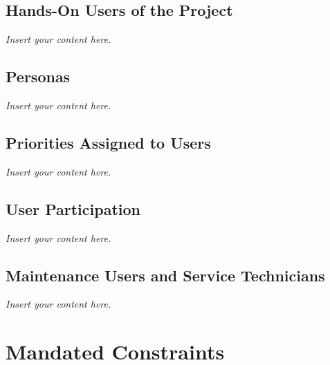 \documentclass[12pt]{article}
\newcommand{\lips}{\textit{Insert your content here.}}
\begin{document}
\subsection{Hands-On Users of the Project}
\lips
\subsection{Personas}
\lips
\subsection{Priorities Assigned to Users}
\lips
\subsection{User Participation}
\lips
\subsection{Maintenance Users and Service Technicians}
\lips

\section{Mandated Constraints}
\end{document}
